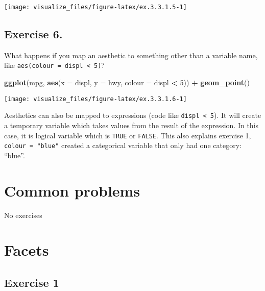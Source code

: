 \documentclass[]{book}
\newenvironment{Shaded}{\begin{snugshade}}{\end{snugshade}}
\newcommand{\DataTypeTok}[1]{\textcolor[rgb]{0.13,0.29,0.53}{#1}}
\newcommand{\DecValTok}[1]{\textcolor[rgb]{0.00,0.00,0.81}{#1}}
\newcommand{\KeywordTok}[1]{\textcolor[rgb]{0.13,0.29,0.53}{\textbf{#1}}}
\newcommand{\NormalTok}[1]{#1}
\newcommand{\OperatorTok}[1]{\textcolor[rgb]{0.81,0.36,0.00}{\textbf{#1}}}
\newcommand{\StringTok}[1]{\textcolor[rgb]{0.31,0.60,0.02}{#1}}
\theoremstyle{plain}
\theoremstyle{remark}
\theoremstyle{definition}
\theoremstyle{definition}
\theoremstyle{definition}
\theoremstyle{remark}
\begin{document}
\begin{center}\texttt{[image: visualize\_files/figure-latex/ex.3.3.1.5-1]} \end{center}

\hypertarget{exercise-6.}{%
\subsection{Exercise 6.}\label{exercise-6.}}

What happens if you map an aesthetic to something other than a variable
name, like \texttt{aes(colour\ =\ displ\ \textless{}\ 5)}?

\begin{Shaded}
\begin{Highlighting}[]
\KeywordTok{ggplot}\NormalTok{(mpg, }\KeywordTok{aes}\NormalTok{(}\DataTypeTok{x =}\NormalTok{ displ, }\DataTypeTok{y =}\NormalTok{ hwy, }\DataTypeTok{colour =}\NormalTok{ displ }\OperatorTok{<}\StringTok{ }\DecValTok{5}\NormalTok{)) }\OperatorTok{+}
\StringTok{  }\KeywordTok{geom_point}\NormalTok{()}
\end{Highlighting}
\end{Shaded}

\begin{center}\texttt{[image: visualize\_files/figure-latex/ex.3.3.1.6-1]} \end{center}

Aesthetics can also be mapped to expressions (code like
\texttt{displ\ \textless{}\ 5}). It will create a temporary variable
which takes values from the result of the expression. In this case, it
is logical variable which is \texttt{TRUE} or \texttt{FALSE}. This also
explains exercise 1, \texttt{colour\ =\ "blue"} created a categorical
variable that only had one category: ``blue''.

\hypertarget{common-problems}{%
\section{Common problems}\label{common-problems}}

No exercises

\hypertarget{facets}{%
\section{Facets}\label{facets}}

\hypertarget{exercise-1-1}{%
\subsection{Exercise 1}\label{exercise-1-1}}
\end{document}
